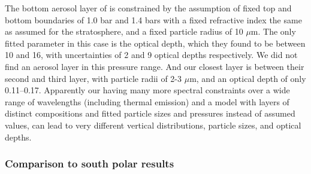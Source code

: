 \documentclass[article,11pt]{emulateapj}
\def\mumx{$\mu$m}
\begin{document}
The bottom aerosol layer of \cite{Sanz-Requena2018} is constrained by
the assumption of fixed top and bottom boundaries of 1.0 bar and 1.4
bars with a fixed refractive index the same as assumed for the
stratosphere, and a fixed particle radius of 10 \mumx.  The only
fitted parameter in this case is the optical depth, which they found
to be between 10 and 16, with uncertainties of 2 and 9 optical depths
respectively.  We did not find an aerosol layer in this pressure
range. And our closest layer is between their second and third layer,
with particle radii of 2-3 \mumx, and an optical depth of only
0.11--0.17.  Apparently our having many more spectral constraints over
a wide range of wavelengths (including thermal emission) and a model
with layers of distinct compositions and fitted particle sizes and
pressures instead of assumed values, can lead to very different
vertical distributions, particle sizes, and optical depths.

\subsubsection{Comparison to south polar results}
\end{document}

